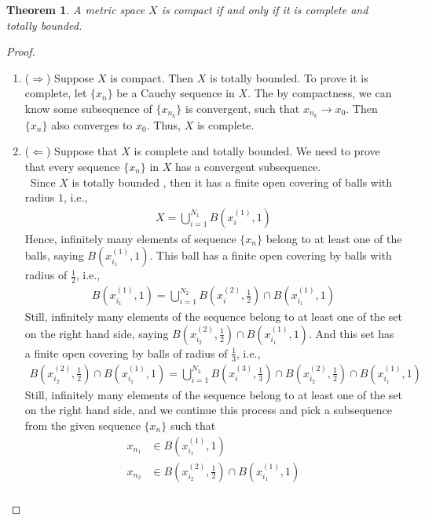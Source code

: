 \documentclass[12pt,leqno]{amsart}
\newtheorem{theorem}{Theorem}[section]
\theoremstyle{definition}
\numberwithin{equation}{subsection}
\begin{document}
\begin{theorem}
A metric space $X$ is compact if and only if it is complete and totally bounded.
\end{theorem}
\begin{proof}
~\begin{enumerate}
    \item ($\Rightarrow$) Suppose $X$ is compact. Then $X$ is totally bounded. To prove it is complete, let $\{x_n\}$ be a Cauchy sequence in $X$.  The by compactness, we can know some subsequence of $\{x_{n_k}\}$ is convergent, such that $x_{n_k}\to x_0$. Then $\{x_n\}$ also converges to $x_0$. Thus, $X$ is complete.
    \item ($\Leftarrow$) Suppose that $X$ is complete and totally bounded. We need to prove that every sequence $\{x_n\}$ in $X$ has a convergent subsequence. \\
    \hspace*{1em}\, Since $X$ is totally bounded , then it has a finite open covering of balls with radius $1$, i.e.,
    \begin{align*}
        X = \bigcup^{N_1}_{i=1}B(x_i^{(1)},1)
    \end{align*}
    Hence, infinitely many elements of sequence $\{x_n\}$ belong to at least one of the balls, saying $B(x_{i_1}^{(1)},1)$. This ball has a finite open covering by balls with radius of $\frac{1}{2}$, i.e.,
    \begin{align*}
        B(x_{i_1}^{(1)},1) = \bigcup^{N_2}_{i=1}B\left(x_i^{(2)},\frac{1}{2}\right)\cap B(x_{i_1}^{(1)},1) 
    \end{align*}
    Still, infinitely many elements of the sequence belong to at least one of the set on the right hand side, saying $B\left(x_{i_2}^{(2)},\frac{1}{2}\right)\cap B(x_{i_1}^{(1)},1)$. And this set has a finite open covering by balls of radius of $\frac{1}{3}$, i.e.,
    \begin{align*}
        B\left(x_{i_2}^{(2)},\frac{1}{2}\right)\cap B(x_{i_1}^{(1)},1) = \bigcup^{N_3}_{i=1} B\left(x_{i}^{(3)},\frac{1}{3}\right)\cap B\left(x_{i_2}^{(2)},\frac{1}{2}\right)\cap B(x_{i_1}^{(1)},1)
    \end{align*}
    Still, infinitely many elements of the sequence belong to at least one of the set on the right hand side, and we continue this process and pick a subsequence from the given sequence $\{x_n\}$ such that 
    \begin{align*}
        x_{n_1} &\in B(x_{i_1}^{(1)},1) \\
        x_{n_2} &\in B\left(x_{i_2}^{(2)},\frac{1}{2}\right)\cap B(x_{i_1}^{(1)},1) \\

\end{align*}
\end{enumerate}
\end{proof}
\end{document}
